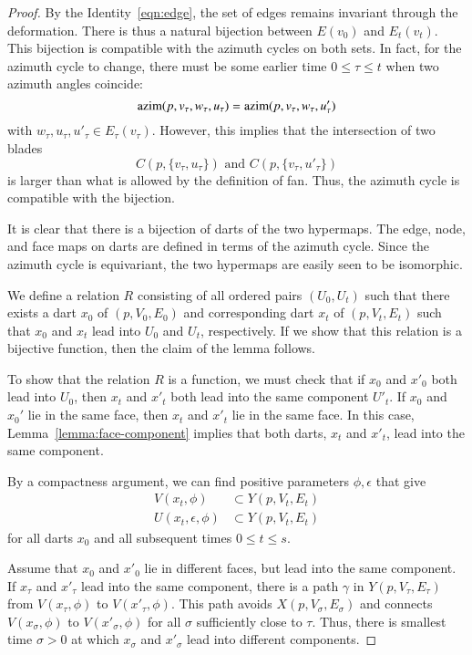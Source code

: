 \begin{proof} By the Identity~\ref{eqn:edge}, the set of
edges remains invariant through the deformation.  There
is thus a natural bijection between $E(v_0)$ and $E_t(v_t)$.
This bijection is compatible with the azimuth cycles on both
sets.  In fact, for the azimuth cycle to change, there must
be some earlier time $0\le\tau \le t$ when two azimuth angles coincide:
$${\operatorname{azim}}(p,v_\tau,w_\tau,u_\tau) = {\operatorname{azim}}(p,v_\tau,w_\tau,u'_\tau)$$
with $w_\tau,u_\tau,u'_\tau\in E_\tau(v_\tau)$.  However, this
implies that the intersection of two blades 
   $$
   C(p,\{v_\tau,u_\tau\}) \text{ and } C(p,\{v_\tau,u'_\tau\})
   $$
is larger than what is allowed by the definition of fan.  Thus,
the azimuth cycle is compatible with the bijection.

It is clear that there is a bijection of darts of the two
hypermaps.   The edge, node, and face maps on darts are defined
in terms of the azimuth cycle.  Since the azimuth cycle is
equivariant, the two hypermaps are easily seen to be isomorphic.

We define a relation $R$ consisting of all ordered pairs $(U_0,U_t)$
such that there exists a dart $x_0$ of $(p,V_0,E_0)$ and 
corresponding dart $x_t$ of $(p,V_t,E_t)$ such that $x_0$
and $x_t$ lead into $U_0$ and $U_t$, respectively.  If we show
that this relation is a bijective function, then the claim
of the lemma follows.

To show that the relation $R$ is a function, we must check that
if $x_0$ and $x'_0$ both lead into $U_0$, then $x_t$ and $x'_t$
both lead into the same component $U'_t$.  If $x_0$ and $x_0'$
lie in the same face, then $x_t$ and $x'_t$ lie in the same face.
In this case, Lemma~\ref{lemma:face-component} 
implies that both darts, $x_t$
and $x'_t$, lead into the same component. 

By a compactness argument, we can find positive parameters
$\phi,\epsilon$ that give 
   $$
   \begin{array}{rll}
   V(x_t,\phi)&\subset Y(p,V_t,E_t)\\
   U(x_t,\epsilon,\phi)&\subset Y(p,V_t,E_t)
   \end{array}
   $$
for all darts $x_0$ and all subsequent times $0\le t\le s$.

Assume that $x_0$ and $x'_0$ lie in different faces, but lead
into the same component.
If $x_\tau$ and $x'_\tau$ lead into the same component, there is
a path $\gamma$ in $Y(p,V_\tau,E_\tau)$
from $V(x_\tau,\phi)$ to $V(x'_\tau,\phi)$.  This path avoids 
$X(p,V_\sigma,E_\sigma)$ and connects $V(x_\sigma,\phi)$ to
$V(x'_\sigma,\phi)$ for all $\sigma$ sufficiently close to $\tau$.
Thus, there is smallest time $\sigma>0$ at which 
$x_\sigma$ and $x'_\sigma$ lead into different components.


\end{proof}
